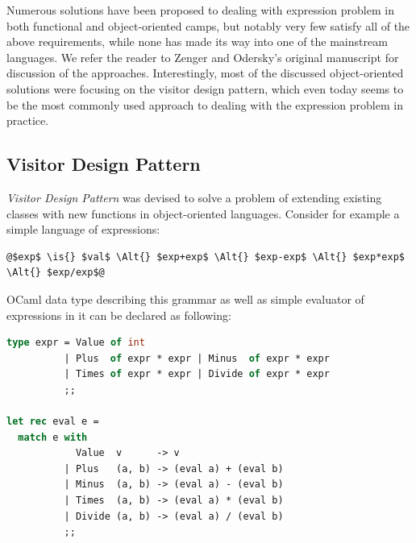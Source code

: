\documentclass[preprint]{sigplanconf}
\newcommand{\Alt}{\ensuremath{|}}
\newcommand{\is}{$::=$}
\begin{document}
\noindent
Numerous solutions have been proposed to dealing with expression problem in both 
functional and object-oriented camps, but notably very few satisfy all of the 
above requirements, while none has made its way into one of the mainstream 
languages. We refer the reader to Zenger and Odersky's original  
manuscript for discussion of the approaches\cite{fool12}. Interestingly, most of 
the discussed object-oriented solutions were focusing on the visitor design 
pattern\cite{DesignPatterns1993}, which even today seems to be the most commonly 
used approach to dealing with the expression problem in practice.

\subsection{Visitor Design Pattern}
\label{sec:vdp}


\emph{Visitor Design Pattern}\cite{DesignPatterns1993} was devised to solve a problem 
of extending existing classes with new functions in object-oriented languages. 
Consider for example a simple language of expressions:

\begin{lstlisting}
@$exp$ \is{} $val$ \Alt{} $exp+exp$ \Alt{} $exp-exp$ \Alt{} $exp*exp$ \Alt{} $exp/exp$@
\end{lstlisting}

\noindent
OCaml data type describing this grammar as well as simple evaluator of expressions 
in it can be declared as following:

\begin{lstlisting}[language=Caml,keepspaces,columns=flexible]
type expr = Value of int 
          | Plus  of expr * expr | Minus  of expr * expr 
          | Times of expr * expr | Divide of expr * expr
          ;;

let rec eval e =
  match e with
            Value  v      -> v
          | Plus   (a, b) -> (eval a) + (eval b)
          | Minus  (a, b) -> (eval a) - (eval b)
          | Times  (a, b) -> (eval a) * (eval b)
          | Divide (a, b) -> (eval a) / (eval b)
          ;;
\end{lstlisting}
\end{document}
